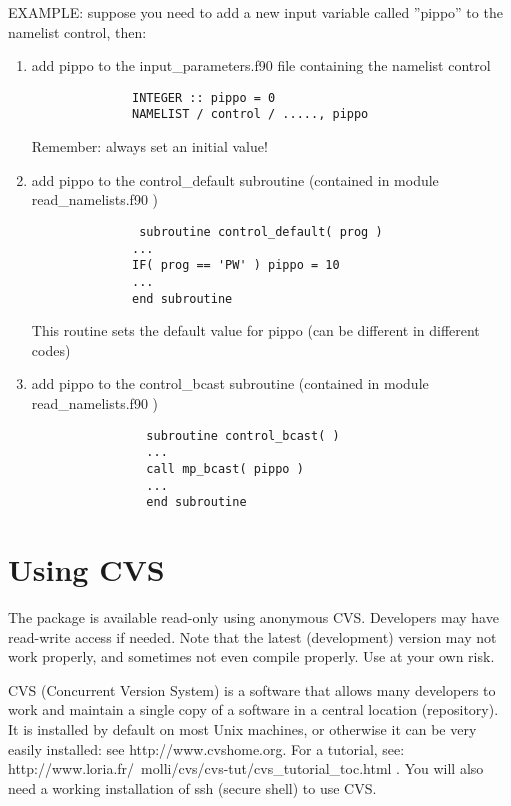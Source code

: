 \documentclass[12pt,a4paper]{article}
\begin{document}
EXAMPLE:
suppose you need to add a new input variable called ''pippo''
to the namelist control, then:

\begin{enumerate}
\item add pippo to the input\_parameters.f90 file containing the
namelist control 
\begin{verbatim}
              INTEGER :: pippo = 0
              NAMELIST / control / ....., pippo
\end{verbatim}
Remember: always set an initial value!

\item add pippo to the control\_default subroutine (contained in
module read\_namelists.f90 ) 
\begin{verbatim}
               subroutine control_default( prog )
              ...
              IF( prog == 'PW' ) pippo = 10
              ...
              end subroutine
\end{verbatim}
This routine sets the default value for pippo (can be different in
different codes) 

\item add pippo to the control\_bcast subroutine (contained in module
read\_namelists.f90 ) 
 \begin{verbatim}
                subroutine control_bcast( )
                ...
                call mp_bcast( pippo )
                ...
                end subroutine
\end{verbatim}
\end{enumerate}
 
\section{ Using CVS}

The package is available read-only using anonymous CVS. Developers may
have read-write access if needed. Note that the latest (development)
version may not work properly, and sometimes not even compile
properly. Use at your own risk. 

CVS (Concurrent Version System) is a software that allows many
developers to work and maintain a single copy of a software in a
central location (repository). It is installed by default on most Unix
machines, or otherwise it can be very easily installed: see
http://www.cvshome.org. For a tutorial, see: 
http://www.loria.fr/~molli/cvs/cvs-tut/cvs\_tutorial\_toc.html .
You will also need a working installation of ssh (secure shell) to use CVS.
\end{document}
